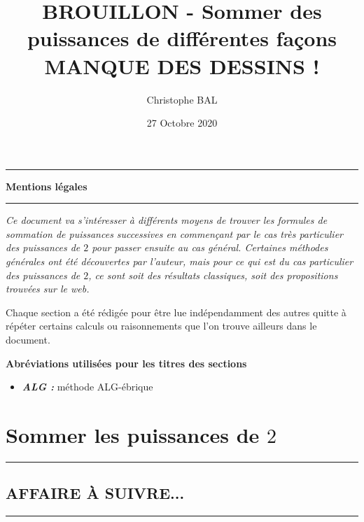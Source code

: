 \documentclass[12pt]{amsbook}
\newcommand\myabrev[1]{\textbf{\emph{#1}}}
\begin{document}
\title{BROUILLON - Sommer des puissances de différentes façons \\ MANQUE DES DESSINS !}
\author{Christophe BAL}
\date{27 Octobre 2020}
\maketitle




\begin{center}
	\hrule\vspace{.3em}
	{
		\fontsize{1.35em}{1em}\selectfont
		\textbf{Mentions \og légales \fg}
	}
			
	\vspace{0.45em}
	\doclicenseThis
	\hrule
\end{center}


\bigskip


\begin{tcolorbox}
	\small\itshape
	Ce document va s'intéresser à différents moyens de trouver les formules de sommation de puissances successives en commençant par le cas très particulier des puissances de $2$ pour passer ensuite au cas général.
	Certaines méthodes générales ont été découvertes par l'auteur, mais pour ce qui est du cas particulier des puissances de $2$, ce sont soit des résultats classiques, soit des propositions trouvées sur le web.
	
	\medskip
	
	Chaque section a été rédigée pour être lue indépendamment des autres quitte à répéter certains calculs ou raisonnements que l'on trouve ailleurs dans le document.
	
	\medskip
	
	\begin{center}
		\textbf{Abréviations utilisées pour les titres des sections} 
	\end{center}
	\begin{itemize}[label=\small\textbullet]
		\item \myabrev{ALG :} méthode ALG-ébrique
	\end{itemize}
\end{tcolorbox}




\setcounter{tocdepth}{1}
\tableofcontents




\chapter{Sommer les puissances de $2$}




%
%
%
%









\bigskip

\hrule

\section{AFFAIRE À SUIVRE...}

\bigskip

\hrule
\end{document}
